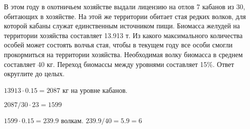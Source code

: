 
В этом году в охотничьем хозяйстве выдали лицензию на отлов 7 кабанов из 30, 
обитающих в хозяйстве. На этой же территории обитает стая редких волков, для 
которой кабаны служат единственным источником пищи. Биомасса желудей на территории 
хозяйства составляет 13.913 т. Из какого максимального количества особей может состоять волчья 
стая, чтобы в текущем году все особи смогли прокормиться на территории хозяйства. 
Необходимая волку биомасса в среднем составляет 40 кг. Переход биомассы между уровнями составляет 15\%. 
Ответ округлите до целых.

\solutionSection

$13913 \cdot 0.15=2087$ кг на уровне кабанов. 

$2087/30 \cdot 23 = 1599$   

$1599 \cdot 0.15=239.9$ волкам. $239.9/40 = 5.9 = 6$

